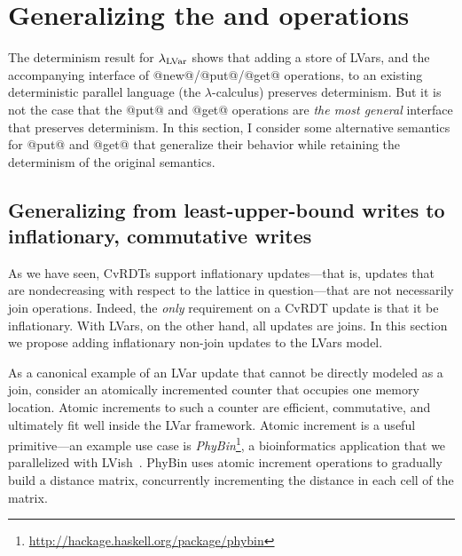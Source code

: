 \section{Generalizing the  and  operations}\label{s:lvars-generalizing}

The determinism result for $\lambda_{\textrm{LVar}}$ shows that adding a store of
LVars, and the accompanying interface of @new@/@put@/@get@ operations,
to an existing deterministic parallel language (the
$\lambda$-calculus) preserves determinism.  But it is not the case
that the @put@ and @get@ operations are \emph{the most general}
interface that preserves determinism.  In this section, I consider
some alternative semantics for @put@ and @get@ that generalize their
behavior while retaining the determinism of the original semantics.

\subsection{Generalizing from least-upper-bound writes to inflationary, commutative writes} 




As we have seen, CvRDTs support inflationary updates---that is,
updates that are nondecreasing with respect to the lattice in
question---that are not necessarily join operations.  Indeed, the
\emph{only} requirement on a CvRDT update is that it be inflationary.
With LVars, on the other hand, all updates are joins.  In this section
we propose adding inflationary non-join updates to the LVars model.

As a canonical example of an LVar update that cannot be directly
modeled as a join, consider an atomically incremented counter that
occupies one memory location.  Atomic increments to such a counter are
efficient, commutative, and ultimately fit well inside the LVar
framework.  Atomic increment is a useful primitive---an example use
case is
\emph{PhyBin}\footnote{\url{http://hackage.haskell.org/package/phybin}},
a bioinformatics application that we parallelized with
LVish~\cite{effectzoo}.  PhyBin uses atomic increment operations to
gradually build a distance matrix, concurrently incrementing the
distance in each cell of the matrix.

